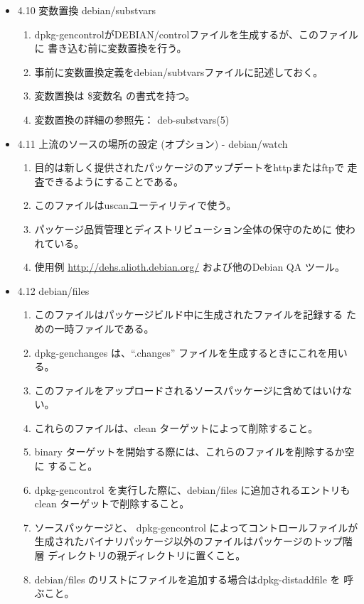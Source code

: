 \documentclass[mingoth,a4paper]{jsarticle}
\begin{document}
\begin{itemize}
\item 4.10 変数置換 debian/substvars
  \begin{enumerate}
  \item  dpkg-gencontrolがDEBIAN/controlファイルを生成するが、このファイルに
    書き込む前に変数置換を行う。
  \item  事前に変数置換定義をdebian/subtvarsファイルに記述しておく。
  \item  変数置換は \${変数名} の書式を持つ。
  \item  変数置換の詳細の参照先： deb-substvars(5)
  \end{enumerate}

\item 4.11 上流のソースの場所の設定 (オプション) - debian/watch
  \begin{enumerate}
  \item 目的は新しく提供されたパッケージのアップデートをhttpまたはftpで
    走査できるようにすることである。
  \item このファイルはuscanユーティリティで使う。
  \item パッケージ品質管理とディストリビューション全体の保守のために
    使われている。
  \item 使用例
    \url{http://dehs.alioth.debian.org/} および他のDebian QA ツール。
  \end{enumerate}

\item 4.12 debian/files
  \begin{enumerate}
  \item このファイルはパッケージビルド中に生成されたファイルを記録する
    ための一時ファイルである。
  \item dpkg-genchanges は、``.changes'' ファイルを生成するときにこれを用いる。
  \item このファイルをアップロードされるソースパッケージに含めてはいけない。
  \item これらのファイルは、clean ターゲットによって削除すること。
  \item binary ターゲットを開始する際には、これらのファイルを削除するか空に
    すること。
  \item dpkg-gencontrol を実行した際に、debian/files に追加されるエントリも
    clean ターゲットで削除すること。
  \item ソースパッケージと、 dpkg-gencontrol によってコントロールファイルが
    生成されたバイナリパッケージ以外のファイルはパッケージのトップ階層
    ディレクトリの親ディレクトリに置くこと。
  \item debian/files のリストにファイルを追加する場合はdpkg-distaddfile を
    呼ぶこと。
  \end{enumerate}


\end{itemize}
\end{document}
